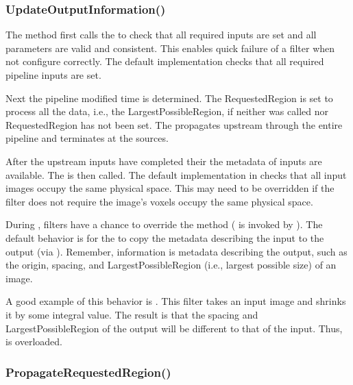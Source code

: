 \subsubsection{UpdateOutputInformation()}
\label{sec:UpdateOutputInformation}

The  method first calls the
 to check that all required inputs
are set and all parameters are valid and consistent. This enables quick
failure of a filter when not configure correctly. The default
implementation checks that all required pipeline inputs are set.

Next the pipeline modified time is determined. The RequestedRegion is
set to process all the data, i.e., the LargestPossibleRegion, if
neither  was called nor
RequestedRegion has not been set. The 
propagates upstream through the entire pipeline and terminates at the
sources.

After the upstream inputs have completed their
 the metadata of inputs are
available. The  is then called. The
default implementation in  checks that all
input images occupy the same physical space. This may need to be
overridden if the filter does not require the image's voxels occupy the
same physical space.

During , filters have a chance to override the
 method
( is invoked by
). The default behavior is for the
 to copy the metadata describing the input
to the output (via ). Remember, information
is metadata describing the output, such as the origin, spacing,
and LargestPossibleRegion (i.e., largest possible size) of an image.

A good example of this behavior is . This filter
takes an input image and shrinks it by some integral value. The result is that
the spacing and LargestPossibleRegion of the output will be different to that
of the input. Thus,  is overloaded.

\subsubsection{PropagateRequestedRegion()}
\label{sec:PropagateRequestedRegion}

